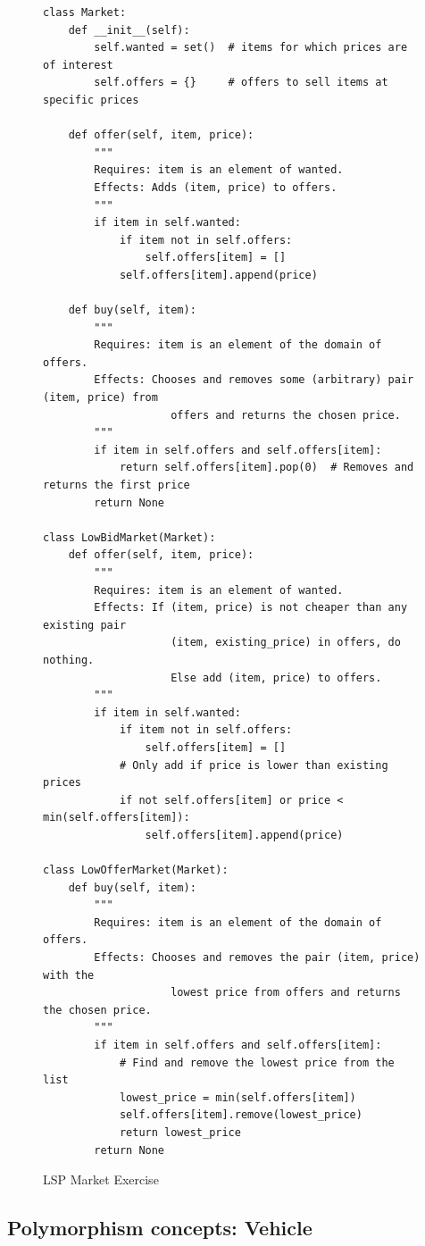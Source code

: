 \documentclass[oneside,11pt,dvipsnames]{book}
\begin{document}
\begin{figure}
\begin{lstlisting}
class Market:
    def __init__(self):
        self.wanted = set()  # items for which prices are of interest
        self.offers = {}     # offers to sell items at specific prices

    def offer(self, item, price):
        """
        Requires: item is an element of wanted.
        Effects: Adds (item, price) to offers.
        """
        if item in self.wanted:
            if item not in self.offers:
                self.offers[item] = []
            self.offers[item].append(price)

    def buy(self, item):
        """
        Requires: item is an element of the domain of offers.
        Effects: Chooses and removes some (arbitrary) pair (item, price) from
                    offers and returns the chosen price.
        """
        if item in self.offers and self.offers[item]:
            return self.offers[item].pop(0)  # Removes and returns the first price
        return None

class LowBidMarket(Market):
    def offer(self, item, price):
        """
        Requires: item is an element of wanted.
        Effects: If (item, price) is not cheaper than any existing pair
                    (item, existing_price) in offers, do nothing.
                    Else add (item, price) to offers.
        """
        if item in self.wanted:
            if item not in self.offers:
                self.offers[item] = []
            # Only add if price is lower than existing prices
            if not self.offers[item] or price < min(self.offers[item]):
                self.offers[item].append(price)

class LowOfferMarket(Market):
    def buy(self, item):
        """
        Requires: item is an element of the domain of offers.
        Effects: Chooses and removes the pair (item, price) with the 
                    lowest price from offers and returns the chosen price.
        """
        if item in self.offers and self.offers[item]:
            # Find and remove the lowest price from the list
            lowest_price = min(self.offers[item])
            self.offers[item].remove(lowest_price)
            return lowest_price
        return None                
\end{lstlisting}
\caption{LSP Market Exercise}\label{ex:lsp-market}
\end{figure}

\subsection{Polymorphism concepts: Vehicle}\label{exercise:vehicle}
\end{document}
